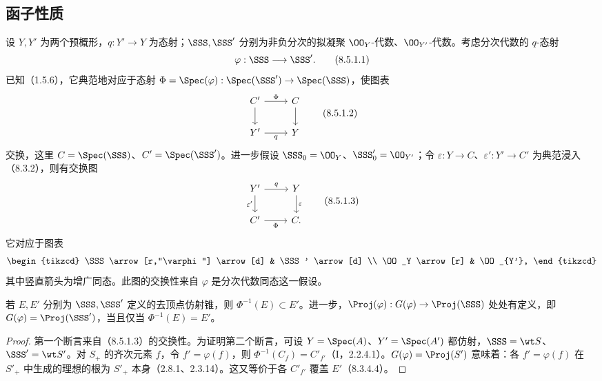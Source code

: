 \subsection{函子性质}
设 $Y,Y'$ 为两个预概形，$q:Y'\to Y$ 为态射；$\SSS,\SSS'$ 分别为非负分次的拟凝聚 $\OO_Y$-代数、$\OO_{Y'}$-代数。考虑分次代数的 $q$-态射
\begin{equation}
\varphi:\SSS\longrightarrow\SSS'.
\tag{8.5.1.1}
\end{equation}
已知（1.5.6），它典范地对应于态射 $\Phi=\Spec(\varphi):\Spec(\SSS')\to\Spec(\SSS)$，使图表
\begin{equation}
\begin{tikzcd}
C' \arrow[r,"\Phi"] \arrow[d] & C \arrow[d] \\
Y' \arrow[r,"q"'] & Y
\end{tikzcd}
\tag{8.5.1.2}
\end{equation}
交换，这里 $C=\Spec(\SSS)$、$C'=\Spec(\SSS')$。进一步假设 $\SSS_0=\OO_Y$、$\SSS'_0=\OO_{Y'}$；令 $\varepsilon:Y\to C$、$\varepsilon':Y'\to C'$ 为典范浸入（8.3.2），则有交换图
\begin{equation}
\begin{tikzcd}
Y' \arrow[r,"q"] \arrow[d,"\varepsilon'"'] & Y \arrow[d,"\varepsilon"] \\
C' \arrow[r,"\Phi"'] & C.
\end{tikzcd}
\tag{8.5.1.3}
\end{equation}
它对应于图表
\[
\begin{tikzcd}
\SSS \arrow[r,"\varphi"] \arrow[d] & \SSS' \arrow[d] \\
\OO_Y \arrow[r] & \OO_{Y'},
\end{tikzcd}
\]
其中竖直箭头为增广同态。此图的交换性来自 $\varphi$ 是分次代数同态这一假设。

若 $E,E'$ 分别为 $\SSS,\SSS'$ 定义的去顶点仿射锥，则 $\Phi^{-1}(E)\subset E'$。进一步，$\Proj(\varphi):G(\varphi)\to\Proj(\SSS)$ 处处有定义，即 $G(\varphi)=\Proj(\SSS')$，当且仅当 $\Phi^{-1}(E)=E'$。
\begin{proof}
第一个断言来自（8.5.1.3）的交换性。为证明第二个断言，可设 $Y=\Spec(A)$、$Y'=\Spec(A')$ 都仿射，$\SSS=\wt S$、$\SSS'=\wt S'$。对 $S_+$ 的齐次元素 $f$，令 $f'=\varphi(f)$，则 $\Phi^{-1}(C_f)=C'_{f'}$（I，2.2.4.1）。$G(\varphi)=\Proj(S')$ 意味着：各 $f'=\varphi(f)$ 在 $S'_+$ 中生成的理想的根为 $S'_+$ 本身（2.8.1、2.3.14）。这又等价于各 $C'_{f'}$ 覆盖 $E'$（8.3.4.4）。
\end{proof}

